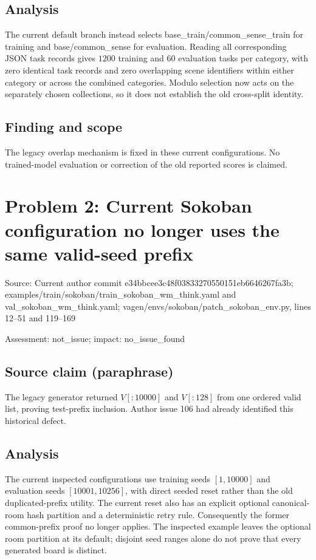 \documentclass[11pt]{article}
\begin{document}
\subsection*{Analysis}

The current default branch instead selects base\_train/common\_sense\_train for training and base/common\_sense for evaluation. Reading all corresponding JSON task records gives \(1200\) training and \(60\) evaluation tasks per category, with zero identical task records and zero overlapping scene identifiers within either category or across the combined categories. Modulo selection now acts on the separately chosen collections, so it does not establish the old cross-split identity.

\subsection*{Finding and scope}

The legacy overlap mechanism is fixed in these current configurations. No trained-model evaluation or correction of the old reported scores is claimed.

\section*{Problem 2: Current Sokoban configuration no longer uses the same valid-seed prefix}

Source: Current author commit e34bbcee3c48f03833270550151eb6646267fa3b; examples/train/sokoban/train\_sokoban\_wm\_think.yaml and val\_sokoban\_wm\_think.yaml; vagen/envs/sokoban/patch\_sokoban\_env.py, lines 12–51 and 119–169

Assessment: not\_issue; impact: no\_issue\_found

\subsection*{Source claim (paraphrase)}

The legacy generator returned \(V[:10000]\) and \(V[:128]\) from one ordered valid list, proving test-prefix inclusion. Author issue 106 had already identified this historical defect.

\subsection*{Analysis}

The current inspected configurations use training seeds \([1,10000]\) and evaluation seeds \([10001,10256]\), with direct seeded reset rather than the old duplicated-prefix utility. The current reset also has an explicit optional canonical-room hash partition and a deterministic retry rule. Consequently the former common-prefix proof no longer applies. The inspected example leaves the optional room partition at its default; disjoint seed ranges alone do not prove that every generated board is distinct.
\end{document}
